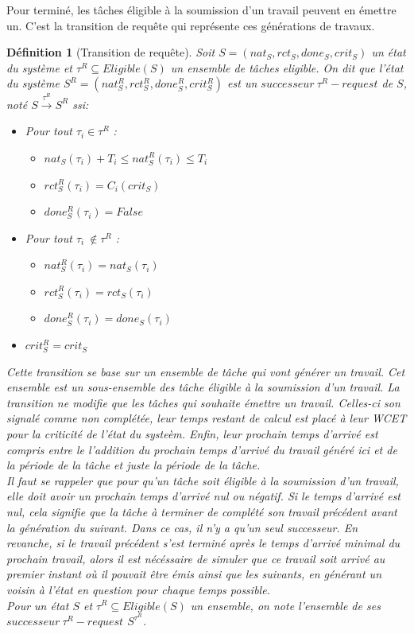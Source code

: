 \documentclass[12pt,a4paper,oneside]{book}
\theoremstyle{break}
\newtheorem{defin}{Définition}[chapter]
\theoremstyle{breakplain}
\begin{document}
Pour terminé, les tâches éligible à la soumission d'un travail peuvent en émettre un. C'est la transition de requête qui représente ces générations de travaux.


\begin{defin}[Transition de requête]
\label{spo:treq}
Soit $S = (nat_S, rct_S, done_S, crit_S)$ un état du système et $\tau^R \subseteq Eligible(S)$ un ensemble de tâches eligible. On dit que l'état du système $S^R = (nat_S^R, rct_S^R, done_S^R, crit_S^R)$ est un $successeur\ \tau^R-request$ de $S$, noté $S\xrightarrow{\tau^R}S^R$ ssi:

\begin{itemize}
\item Pour tout $\tau_i \in \tau^R$ :\begin{itemize}
    \item $nat_S(\tau_i)+T_i \leq nat_S^R(\tau_i) \leq T_i$
    \item $rct_S^R(\tau_i)=C_i(crit_S)$
    \item $done_S^R(\tau_i) = False$
\end{itemize}
\item Pour tout $\tau_i\ \notin \tau^R$ :\begin{itemize}
    \item $nat_S^R(\tau_i)=nat_S(\tau_i)$
    \item $rct_S^R(\tau_i)=rct_S(\tau_i)$
    \item $done_S^R(\tau_i) = done_S(\tau_i)$
\end{itemize}
\item $crit_S^R = crit_S$
\end{itemize}
Cette transition se base sur un ensemble de tâche qui vont générer un travail. Cet ensemble est un sous-ensemble des tâche éligible à la soumission d'un travail. La transition ne modifie que les tâches qui souhaite émettre un travail. Celles-ci son signalé comme non complétée, leur temps restant de calcul est placé à leur WCET pour la criticité de l'état du systeèm. Enfin, leur prochain temps d'arrivé est compris entre le l'addition du prochain temps d'arrivé du travail généré ici et de la période de la tâche et juste la période de la tâche.\\
Il faut se rappeler que pour qu'un tâche soit éligible à la soumission d'un travail, elle doit avoir un prochain temps d'arrivé nul ou négatif. Si le temps d'arrivé est nul, cela signifie que la tâche à terminer de complété son travail précédent avant la génération du suivant. Dans ce cas, il n'y a qu'un seul successeur. En revanche, si le travail précédent s'est terminé après le temps d'arrivé minimal du prochain travail, alors il est nécéssaire de simuler que ce travail soit arrivé au premier instant où il pouvait être émis ainsi que les suivants, en générant un voisin à l'état en question pour chaque temps possible.\\

Pour un état $S$ et $\tau^R \subseteq Eligible(S)$ un ensemble, on note l'ensemble de ses $successeur\ \tau^R-request$ $S^{\tau^R}$.

\end{defin}
\end{document}
